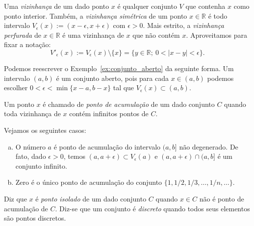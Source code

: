\begin{defn}
  Uma \emph{vizinhança} de um dado ponto $x$ é qualquer conjunto $V$ que contenha $x$ como ponto interior. Também, a \emph{vizinhança simétrica} de um ponto $x\in\mathbb{R}$ é todo intervalo $V_\epsilon(x) := (x-\epsilon, x+\epsilon)$ com $\epsilon>0$. Mais estrito, a \emph{vizinhança perfurada} de $x\in\mathbb{R}$ é uma vizinhança de $x$ que não contém $x$. Aproveitamos para fixar a notação:
  \begin{equation*}
    V'_\epsilon(x) := V_\epsilon(x)\setminus \{x\} = \{y\in\mathbb{R};~0<|x-y|<\epsilon\}.
  \end{equation*}
\end{defn}

\begin{ex}
  Podemos reescrever o Exemplo~\ref{ex:conjunto_aberto} da seguinte forma. Um intervalo $(a, b)$ é um conjunto aberto, pois para cada $x\in (a, b)$ podemos escolher $0<\epsilon<\min\{x-a,b-x\}$ tal que $V_\epsilon(x)\subset (a, b)$.
\end{ex}

\begin{defn}
  Um ponto $x$ é chamado de \emph{ponto de acumulação} de um dado conjunto $C$ quando toda vizinhança de $x$ contém infinitos pontos de $C$.
\end{defn}

\begin{ex}
  Vejamos os seguintes casos:
  \begin{enumerate}[a)]
  \item O número $a$ é ponto de acumulação do intervalo $(a, b]$ não degenerado. De fato, dado $\epsilon>0$, temos $(a, a+\epsilon)\subset V_\epsilon(a)$ e $(a, a+\epsilon)\cap (a, b]$ é um conjunto infinito.
  \item Zero é o único ponto de acumulação do conjunto $\{1, 1/2, 1/3, \dotsc, 1/n, \ldots\}$.
  \end{enumerate}
\end{ex}

\begin{defn}
  Diz que $x$ é \emph{ponto isolado} de um dado conjunto $C$ quando $x\in C$ não é ponto de acumulação de $C$. Diz-se que um conjunto é \emph{discreto} quando todos seus elementos são pontos discretos.
\end{defn}


